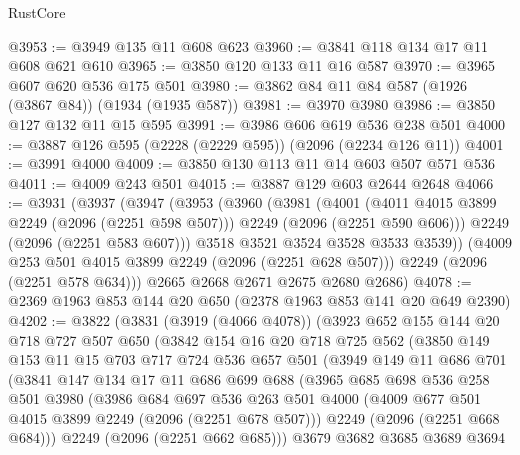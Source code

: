 \begin{lexlean}{RustCore}
\begin{coremodule}
@3953 := @3949 @135 @11 @608 @623
@3960 := @3841 @118 @134 @17 @11 @608 @621 @610
@3965 := @3850 @120 @133 @11 @16 @587
@3970 := @3965 @607 @620 @536 @175 @501
@3980 := @3862 @84 @11 @84 @587 (@1926 (@3867 @84)) (@1934 (@1935 @587))
@3981 := @3970 @3980
@3986 := @3850 @127 @132 @11 @15 @595
@3991 := @3986 @606 @619 @536 @238 @501
@4000 := @3887 @126 @595 (@2228 (@2229 @595)) (@2096 (@2234 @126 @11))
@4001 := @3991 @4000
@4009 := @3850 @130 @113 @11 @14 @603 @507 @571 @536
@4011 := @4009 @243 @501
@4015 := @3887 @129 @603 @2644 @2648
@4066 := @3931
    (@3937
      (@3947
        (@3953
          (@3960
            (@3981
              (@4001
                (@4011 @4015 @3899 @2249 (@2096 (@2251 @598 @507)))
                @2249
                (@2096 (@2251 @590 @606)))
              @2249
              (@2096 (@2251 @583 @607)))
            @3518
            @3521
            @3524
            @3528
            @3533
            @3539))
        (@4009 @253 @501 @4015 @3899 @2249 (@2096 (@2251 @628 @507)))
        @2249
        (@2096 (@2251 @578 @634)))
      @2665
      @2668
      @2671
      @2675
      @2680
      @2686)
@4078 := @2369 @1963 @853 @144 @20 @650 (@2378 @1963 @853 @141 @20 @649 @2390)
@4202 := @3822
    (@3831
      (@3919 (@4066 @4078))
      (@3923
        @652
        @155
        @144
        @20
        @718
        @727
        @507
        @650
        (@3842
          @154
          @16
          @20
          @718
          @725
          @562
          (@3850
            @149
            @153
            @11
            @15
            @703
            @717
            @724
            @536
            @657
            @501
            (@3949
              @149
              @11
              @686
              @701
              (@3841
                @147
                @134
                @17
                @11
                @686
                @699
                @688
                (@3965
                  @685
                  @698
                  @536
                  @258
                  @501
                  @3980
                  (@3986
                    @684
                    @697
                    @536
                    @263
                    @501
                    @4000
                    (@4009 @677 @501 @4015 @3899 @2249 (@2096 (@2251 @678 @507)))
                    @2249
                    (@2096 (@2251 @668 @684)))
                  @2249
                  (@2096 (@2251 @662 @685)))
                @3679
                @3682
                @3685
                @3689
                @3694

\end{coremodule}
\end{lexlean}
